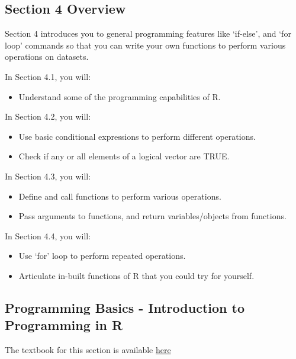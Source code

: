 \documentclass[]{article}
\providecommand{\tightlist}{%
  \setlength{\itemsep}{0pt}\setlength{\parskip}{0pt}}
\begin{document}
\hypertarget{section-4-overview}{%
\subsection{Section 4 Overview}\label{section-4-overview}}

Section 4 introduces you to general programming features like `if-else',
and `for loop' commands so that you can write your own functions to
perform various operations on datasets.

In Section 4.1, you will:

\begin{itemize}
\tightlist
\item
  Understand some of the programming capabilities of R.
\end{itemize}

In Section 4.2, you will:

\begin{itemize}
\tightlist
\item
  Use basic conditional expressions to perform different operations.
\item
  Check if any or all elements of a logical vector are TRUE.
\end{itemize}

In Section 4.3, you will:

\begin{itemize}
\tightlist
\item
  Define and call functions to perform various operations.
\item
  Pass arguments to functions, and return variables/objects from
  functions.
\end{itemize}

In Section 4.4, you will:

\begin{itemize}
\tightlist
\item
  Use `for' loop to perform repeated operations.
\item
  Articulate in-built functions of R that you could try for yourself.
\end{itemize}

\hypertarget{programming-basics---introduction-to-programming-in-r}{%
\subsection{Programming Basics - Introduction to Programming in
R}\label{programming-basics---introduction-to-programming-in-r}}

The textbook for this section is available
\href{https://rafalab.github.io/dsbook/programming-basics.html}{here}
\end{document}
